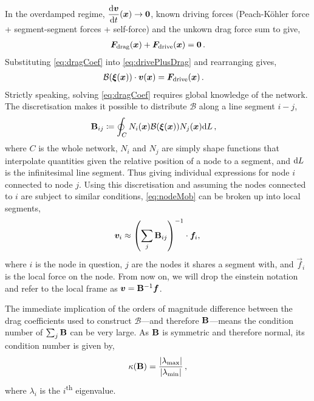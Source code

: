 In the overdamped regime, $\dfrac{\rvar{d}\vec{v}}{\rvar{d}t}(\vec{x}) \to \vec{0}$, known driving forces (Peach-K\"{o}hler force + segment-segment forces + self-force) and the unkown drag force sum to give,
\begin{align}\label{eq:drivePlusDrag}
    \vec{F}_\rvar{drag}(\vec{x}) + \vec{F}_\rvar{drive}(\vec{x}) = \vec{0}\,.
\end{align}
Substituting \cref{eq:dragCoef} into \cref{eq:drivePlusDrag} and rearranging gives,
\begin{align}\label{eq:nodeMob}
    \mathcal{B}(\vec{\xi}(\vec{x})) \cdot \vec{v}(\vec{x}) & = \vec{F}_\rvar{drive}(\vec{x})\,.
\end{align}
Strictly speaking, solving \cref{eq:dragCoef} requires global knowledge of the network. The discretisation makes it possible to distribute $\mathcal{B}$ along a line segment $i-j$,
\begin{align}\label{eq:dragMatrix}
    \mtx{B}_{ij} & \coloneqq \oint_{C} N_i(\vec{x}) \mathcal{B}(\vec{\xi}(\vec{x})) N_j(\vec{x}) \rvar{d}L\,,
\end{align}
where $C$ is the whole network, $N_i$ and $N_j$ are simply shape functions that interpolate quantities given the relative position of a node to a segment, and $\textrm{d}L$ is the infinitesimal line segment. Thus giving individual expressions for node $i$ connected to node $j$. Using this discretisation and assuming the nodes connected to $i$ are subject to similar conditions, \cref{eq:nodeMob} can be broken up into local segments,
\begin{align}\label{eq:nodeVel}
    \vec{v}_i \approx \left(\sum\limits_j \mtx{B}_{ij}\right)^{-1} \cdot \vec{f}_i,\,
\end{align}
where $i$ is the node in question, $j$ are the nodes it shares a segment with, and $\vec{f}_i$ is the local force on the node. From now on, we will drop the einstein notation and refer to the local frame as $\vec{v} = \mtx{B}^{-1} \vec{f}$.

The immediate implication of the orders of magnitude difference between the drag coefficients used to construct $\mathcal{B}$---and therefore $\mathbf{B}$---means the condition number of $\sum_j \mathbf{B}$ can be very large. As $\mathbf{B}$ is symmetric and therefore normal, its condition number is given by,
\begin{align}\label{eq:conditionNumb}
    \kappa(\mathbf{B}) = \dfrac{\lvert \lambda_{\textrm{max}} \rvert}{\lvert \lambda_{\textrm{min}} \rvert} \,,
\end{align}
where $\lambda_i$ is the $i$\textsuperscript{th} eigenvalue.

